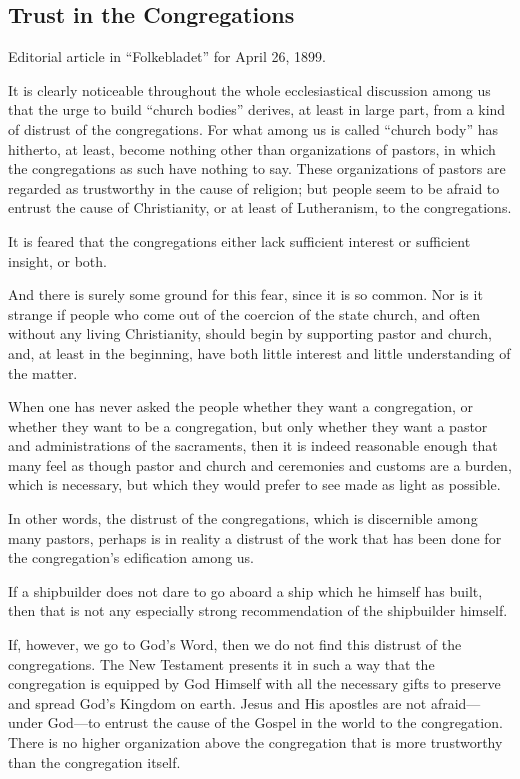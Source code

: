 
\subsection{Trust in the Congregations}

Editorial article in “Folkebladet” for April 26, 1899.

It is clearly noticeable throughout the whole ecclesiastical discussion among us that the urge to build “church bodies” derives, at least in large part, from a kind of distrust of the congregations. For what among us is called “church body” has hitherto, at least, become nothing other than organizations of pastors, in which the congregations as such have nothing to say. These organizations of pastors are regarded as trustworthy in the cause of religion; but people seem to be afraid to entrust the cause of Christianity, or at least of Lutheranism, to the congregations.

It is feared that the congregations either lack sufficient interest or sufficient insight, or both.

And there is surely some ground for this fear, since it is so common. Nor is it strange if people who come out of the coercion of the state church, and often without any living Christianity, should begin by supporting pastor and church, and, at least in the beginning, have both little interest and little understanding of the matter.

When one has never asked the people whether they want a congregation, or whether they want to be a congregation, but only whether they want a pastor and administrations of the sacraments, then it is indeed reasonable enough that many feel as though pastor and church and ceremonies and customs are a burden, which is necessary, but which they would prefer to see made as light as possible.

In other words, the distrust of the congregations, which is discernible among many pastors, perhaps is in reality a distrust of the work that has been done for the congregation’s edification among us.

If a shipbuilder does not dare to go aboard a ship which he himself has built, then that is not any especially strong recommendation of the shipbuilder himself.

If, however, we go to God’s Word, then we do not find this distrust of the congregations. The New Testament presents it in such a way that the congregation is equipped by God Himself with all the necessary gifts to preserve and spread God’s Kingdom on earth. Jesus and His apostles are not afraid—under God—to entrust the cause of the Gospel in the world to the congregation. There is no higher organization above the congregation that is more trustworthy than the congregation itself.

